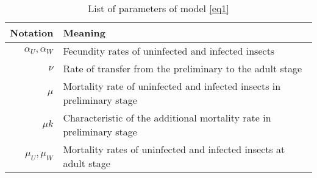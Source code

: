 \begin{table}
\begin{center}
\begin{tabular}{|r|l|}
\hline
Notation & Meaning\\
\hline\hline
$\alpha_U, \alpha_W$ & Fecundity rates of uninfected and infected insects\\
$\nu$ & Rate of transfer from the preliminary to the adult stage\\
$\mu$ & Mortality rate of uninfected and infected insects in preliminary stage\\
$\mu k$ & Characteristic of the additional mortality rate in preliminary stage\\
$\mu_U, \mu_W$ & Mortality rates of uninfected and infected insects at adult stage\\
\hline
\end{tabular}
\caption{List of parameters of model \eqref{eq1}}
\label{ta1}
\end{center}
\end{table}